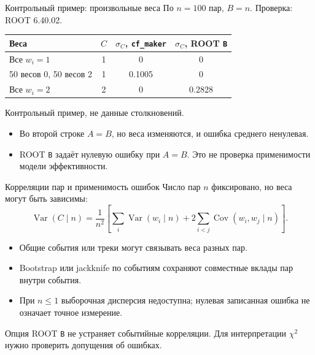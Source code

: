 \begin{frame}{Контрольный пример: произвольные веса}
    \small
    По $n=100$ пар, $B=n$. Проверка: ROOT 6.40.02.
    \begin{center}
        \renewcommand{\arraystretch}{1.35}
        \begin{tabular}{lccc}
            \hline
            Веса & $C$ & $\sigma_C$, \texttt{cf\_maker} & $\sigma_C$, ROOT \texttt{B}\\ \hline
            Все $w_i=1$ & 1 & 0 & 0\\
            50 весов 0, 50 весов 2 & 1 & 0.1005 & 0\\
            Все $w_i=2$ & 2 & 0 & 0.2828\\ \hline
        \end{tabular}
        \par\smallskip
        Контрольный пример, не данные столкновений.
    \end{center}
    \begin{itemize}
        \item Во второй строке $A=B$, но веса изменяются, и ошибка среднего ненулевая.
        \item ROOT \texttt{B} задаёт нулевую ошибку при $A=B$.
              Это не проверка применимости модели эффективности.
    \end{itemize}
\end{frame}

\begin{frame}{Корреляции пар и применимость ошибок}
    \small
    Число пар $n$ фиксировано, но веса могут быть зависимы:
    \[
        \operatorname{Var}(C\mid n)=\frac{1}{n^2}
        \left[\sum_i\operatorname{Var}(w_i\mid n)
        +2\sum_{i<j}\operatorname{Cov}(w_i,w_j\mid n)\right].
    \]
    \begin{itemize}
        \item Общие события или треки могут связывать веса разных пар.
        \item Bootstrap или jackknife по событиям сохраняют
              совместные вклады пар внутри события.
        \item При $n\leq 1$ выборочная дисперсия недоступна;
              нулевая записанная ошибка не означает точное измерение.
    \end{itemize}
    Опция ROOT \texttt{B} не устраняет событийные корреляции.
    Для интерпретации $\chi^2$ нужно проверить допущения об ошибках.
\end{frame}
